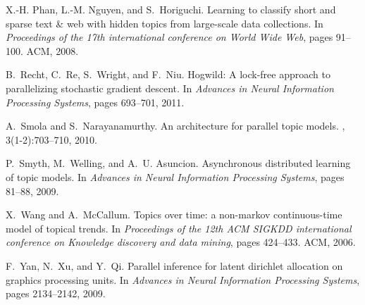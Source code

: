 \documentclass[10pt,conference]{IEEEtran}
\begin{document}
\begin{thebibliography}{10}
X.-H. Phan, L.-M. Nguyen, and S.~Horiguchi.
\newblock Learning to classify short and sparse text \& web with hidden topics
  from large-scale data collections.
\newblock In {\em Proceedings of the 17th international conference on World
  Wide Web}, pages 91--100. ACM, 2008.

B.~Recht, C.~Re, S.~Wright, and F.~Niu.
\newblock Hogwild: A lock-free approach to parallelizing stochastic gradient
  descent.
\newblock In {\em Advances in Neural Information Processing Systems}, pages
  693--701, 2011.

A.~Smola and S.~Narayanamurthy.
\newblock An architecture for parallel topic models.
, 3(1-2):703--710, 2010.

P.~Smyth, M.~Welling, and A.~U. Asuncion.
\newblock Asynchronous distributed learning of topic models.
\newblock In {\em Advances in Neural Information Processing Systems}, pages
  81--88, 2009.

X.~Wang and A.~McCallum.
\newblock Topics over time: a non-markov continuous-time model of topical
  trends.
\newblock In {\em Proceedings of the 12th ACM SIGKDD international conference
  on Knowledge discovery and data mining}, pages 424--433. ACM, 2006.

F.~Yan, N.~Xu, and Y.~Qi.
\newblock Parallel inference for latent dirichlet allocation on graphics
  processing units.
\newblock In {\em Advances in Neural Information Processing Systems}, pages
  2134--2142, 2009.

\end{thebibliography}
 
\end{document}
